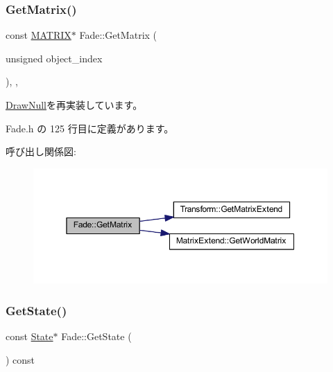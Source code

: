 \subsubsection{\texorpdfstring{Get\+Matrix()}{GetMatrix()}}
{\footnotesize\ttfamily const \mbox{\hyperlink{_vector3_d_8h_a032295cd9fb1b711757c90667278e744}{M\+A\+T\+R\+IX}}$\ast$ Fade\+::\+Get\+Matrix (\begin{DoxyParamCaption}\item[{unsigned}]{object\+\_\+index }\end{DoxyParamCaption})\hspace{0.3cm}{\ttfamily [inline]}, {\ttfamily [override]}, {\ttfamily [virtual]}}



\mbox{\hyperlink{class_draw_null_adede079e9c11a756090740b20bb43022}{Draw\+Null}}を再実装しています。



 Fade.\+h の 125 行目に定義があります。

呼び出し関係図\+:\nopagebreak
\begin{figure}[H]
\begin{center}
\leavevmode
\includegraphics[width=350pt]{class_fade_a6aed6912ebf9c243c52cb82f298d8d64_cgraph}
\end{center}
\end{figure}
\mbox{\label{class_fade_aeb41dfcadf75dd4c980da68e243cc310}} 
\subsubsection{\texorpdfstring{Get\+State()}{GetState()}}
{\footnotesize\ttfamily const \mbox{\hyperlink{class_fade_ae77826bf3ff2ab95fb7b3b6f95cba80a}{State}}$\ast$ Fade\+::\+Get\+State (\begin{DoxyParamCaption}{ }\end{DoxyParamCaption}) const\hspace{0.3cm}{\ttfamily [inline]}}



